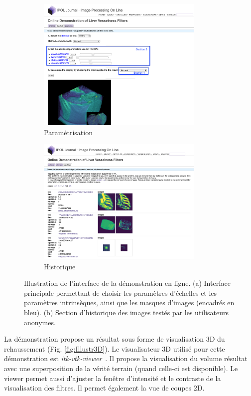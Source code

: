 \begin{figure}[!ht]
    \begin{subfigure}{0.45\textwidth}
        \centering
        \includegraphics[width=8cm]{Images/visuBenchmarkDemos.png}
        \caption{Paramétrisation}
    \end{subfigure}
    \begin{subfigure}{0.45\textwidth}
        \centering
        \includegraphics[width=8cm]{Images/visuBenchmarkDemosArchivesTrim.png}
        \caption{Historique}
    \end{subfigure}

    \caption{Illustration de l'interface de la démonstration en ligne. (a) Interface principale permettant de choisir les paramètres d'échelles et les paramètres intrinsèques, ainsi que les masques d'images (encadrés en bleu). (b) Section d'historique des images testés par les utilisateurs anonymes.}
    \label{fig:DemoExample}
\end{figure}

La démonstration propose un résultat sous forme de visualisation 3D du rehaussement (Fig. \ref{fig:Illustr3D}). Le visualisateur 3D utilisé pour cette démonstration est \textit{itk-vtk-viewer}~\cite{Mccormick2020_Visu3DDemo}. Il propose la visualisation du volume résultat avec une superposition de la vérité terrain (quand celle-ci est disponible). Le viewer permet aussi d'ajuster la fenêtre d'intensité et le contraste de la visualisation des filtres. Il permet également la vue de coupes 2D.

